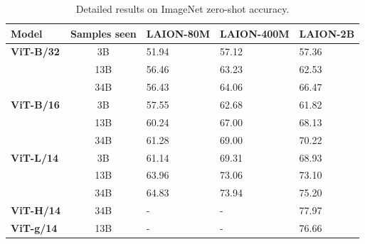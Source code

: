 \begin{appendix}
\begin{table}[tb]
\small
\centering
{}
\small
\begin{tabular}{@{}lclll@{}}
\toprule
\textbf{Model}                     & \textbf{Samples seen} & \textbf{LAION-80M} & \textbf{LAION-400M} & \textbf{LAION-2B} \\ \midrule
\textbf{ViT-B/32} & 3B           & 51.94     & 57.12      & 57.36       \\
                          & 13B          & 56.46     & 63.23       & 62.53       \\
                          & 34B          & 56.43         & 64.06      &66.47        \\ \midrule
\textbf{ViT-B/16} & 3B           & 57.55     & 62.68      & 61.82       \\
                          & 13B          & 60.24     & 67.00       & 68.13       \\
                          & 34B          & 61.28         & 69.00      & 70.22        \\ \midrule                          
\textbf{ViT-L/14} & 3B           & 61.14     & 69.31      & 68.93       \\         
& 13B          & 63.96         & 73.06      & 73.10           \\
                          & 34B          & 64.83         & 73.94       & 75.20       \\ \midrule 
\textbf{ViT-H/14} & 34B           & -     & -      & 77.97       \\         \midrule 
\textbf{ViT-g/14} & 13B           & -     & -      & 76.66       \\         \bottomrule 

\end{tabular}
\caption{Detailed results on ImageNet zero-shot accuracy.
}
\label{table:zeroshot_im1k}
\end{table}



\end{appendix}
